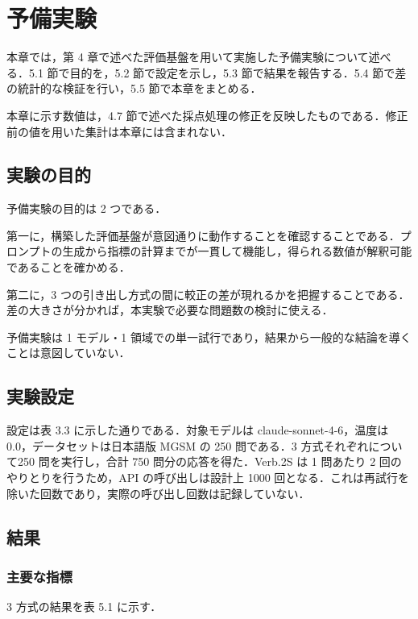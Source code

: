 \chapter{予備実験}

本章では，第 4 章で述べた評価基盤を用いて実施した予備実験について述べる．5.1 節で目的を，5.2 節で設定を示し，5.3 節で結果を報告する．5.4 節で差の統計的な検証を行い，5.5 節で本章をまとめる．

本章に示す数値は，4.7 節で述べた採点処理の修正を反映したものである．修正前の値を用いた集計は本章には含まれない．

\section{実験の目的}

予備実験の目的は 2 つである．

第一に，構築した評価基盤が意図通りに動作することを確認することである．プロンプトの生成から指標の計算までが一貫して機能し，得られる数値が解釈可能であることを確かめる．

第二に，3 つの引き出し方式の間に較正の差が現れるかを把握することである．差の大きさが分かれば，本実験で必要な問題数の検討に使える．

予備実験は 1 モデル・1 領域での単一試行であり，結果から一般的な結論を導くことは意図していない．

\section{実験設定}

設定は表 3.3 に示した通りである．対象モデルは claude-sonnet-4-6，温度は0.0，データセットは日本語版 MGSM の 250 問である．3 方式それぞれについて250 問を実行し，合計 750 問分の応答を得た．Verb.2S は 1 問あたり 2 回のやりとりを行うため，API の呼び出しは設計上 1000 回となる．これは再試行を除いた回数であり，実際の呼び出し回数は記録していない．

\section{結果}

\subsection{主要な指標}

3 方式の結果を表 5.1 に示す．

